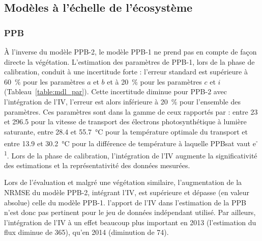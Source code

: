 \subsection{Modèles à l'échelle de l'écosystème}

\subsubsection{PPB}


À l'inverse du modèle PPB-2, le modèle PPB-1 ne prend pas en compte de façon directe la végétation.
L'estimation des paramètres de PPB-1, lors de la phase de calibration, conduit à une incertitude forte : l'erreur standard est supérieure à \SI{60}{\percent} pour les paramètres $a$ et $b$ et à \SI{20}{\percent} pour les paramètres $c$ et $i$ (Tableau~\ref{table:mdl_par}).
Cette incertitude diminue pour PPB-2 avec l'intégration de l'IV, l'erreur est alors inférieure à \SI{20}{\percent} pour l'ensemble des paramètres.
Ces paramètres sont dans la gamme de ceux rapportés par \citet{june2004} : entre \num{23} et \SI{296.5}{\umle} pour la vitesse de transport des électrons photosynthétique à lumière saturante, entre \num{28.4} et \SI{55.7}{\degreeCelsius} pour la température optimale du transport et entre \num{13.9} et \SI{30.2}{\degreeCelsius} pour la différence de température à laquelle PPBsat vaut e\textsuperscript{-1}.
Lors de la phase de calibration, l'intégration de l'IV augmente la significativité des estimations et la représentativité des données mesurées.

Lors de l'évaluation et malgré une végétation similaire, l'augmentation de la NRMSE du modèle PPB-2, intégrant l'IV, est supérieure et dépasse (en valeur absolue) celle du modèle PPB-1. l'apport de l'IV dans l'estimation de la PPB n'est donc pas pertinent pour le jeu de données indépendant utilisé.
Par ailleurs, l'intégration de l'IV à un effet beaucoup plus important en 2013 (l'estimation du flux diminue de \SI{365}{\gcma}), qu'en 2014 (diminution de \SI{74}{\gcma}).
%

%

